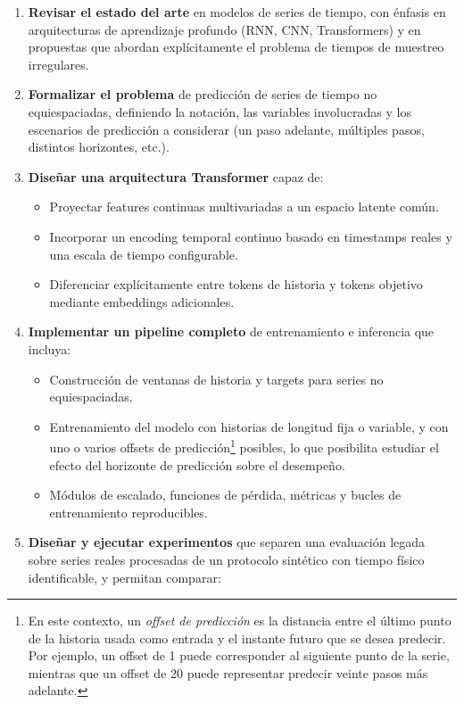 \begin{enumerate}
    \item \textbf{Revisar el estado del arte} en modelos de series de tiempo, con énfasis en arquitecturas de aprendizaje profundo (RNN, CNN, Transformers) y en propuestas que abordan explícitamente el problema de tiempos de muestreo irregulares.
    \item \textbf{Formalizar el problema} de predicción de series de tiempo no equiespaciadas, definiendo la notación, las variables involucradas y los escenarios de predicción a considerar (un paso adelante, múltiples pasos, distintos horizontes, etc.).
    \item \textbf{Diseñar una arquitectura Transformer} capaz de:
    \begin{itemize}
        \item Proyectar features continuas multivariadas a un espacio latente común.
        \item Incorporar un encoding temporal continuo basado en timestamps reales y una escala de tiempo configurable.
        \item Diferenciar explícitamente entre tokens de historia y tokens objetivo mediante embeddings adicionales.
    \end{itemize}
    \item \textbf{Implementar un pipeline completo} de entrenamiento e inferencia que incluya:
    \begin{itemize}
        \item Construcción de ventanas de historia y targets para series no equiespaciadas.
        \item Entrenamiento del modelo con historias de longitud fija o variable, y con uno o varios offsets de predicción\footnote{En este contexto, un \emph{offset de predicción} es la distancia entre el último punto de la historia usada como entrada y el instante futuro que se desea predecir. Por ejemplo, un offset de 1 puede corresponder al siguiente punto de la serie, mientras que un offset de 20 puede representar predecir veinte pasos más adelante.} posibles, lo que posibilita estudiar el efecto del horizonte de predicción sobre el desempeño.
        \item Módulos de escalado, funciones de pérdida, métricas y bucles de entrenamiento reproducibles.
    \end{itemize}
    \item \textbf{Diseñar y ejecutar experimentos} que separen una evaluación legada sobre series reales procesadas de un protocolo sintético con tiempo físico identificable, y permitan comparar:

\end{enumerate}
